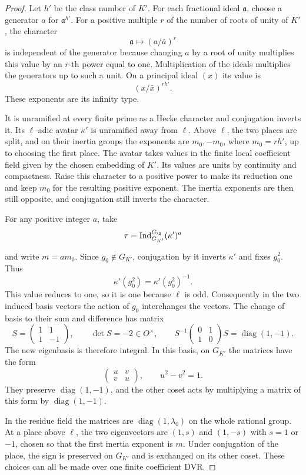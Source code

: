 \begin{proof}
Let \(h'\) be the class number of \(K'\). For each fractional
ideal \(\mathfrak a\), choose a generator \(a\) for
\(\mathfrak a^{h'}\). For a positive multiple \(r\) of
the number of roots of unity of \(K'\), the character
\[
                 \mathfrak a\longmapsto (a/\bar a)^r
\]
is independent of the generator because changing \(a\) by a
root of unity multiplies this value by an \(r\)-th power equal
to one. Multiplication of the ideals multiplies the generators
up to such a unit. On a principal ideal \((x)\) its value is
\[
                       (x/\bar x)^{rh'}.
\]
These exponents are its infinity type.

It is unramified at every finite prime as a Hecke character
and conjugation inverts it. Its \(\ell\)-adic avatar
\(\kappa'\) is unramified away from \(\ell\).
Above \(\ell\), the two places are split, and on their
inertia groups the exponents are \(m_0,-m_0\), where
\(m_0=rh'\), up to choosing the first place.
The avatar takes values in the finite local coefficient
field given by the chosen embedding of \(K'\).
Its values are units by continuity and compactness.
Raise this character to a positive power to make its
reduction one and keep \(m_0\) for the resulting
positive exponent. The inertia exponents are then
still opposite, and conjugation still inverts the
character.

For any positive integer \(a\), take
\[
 \tau=\operatorname{Ind}_{G_{K'}}^{G_{\Q}} (\kappa')^a
\]

and write \(m=am_0\). Since \(g_0\notin G_{K'}\), conjugation by it inverts
\(\kappa'\) and fixes \(g_0^2\). Thus
\[
 \kappa'(g_0^2)=\kappa'(g_0^2)^{-1}.
\]
This value reduces
to one, so it is one because \(\ell\) is odd.
Consequently in the two induced basis vectors the action
of \(g_0\) interchanges the vectors. The change of basis to their sum and difference has matrix
\[
 S=\begin{pmatrix}1&1\\1&-1\end{pmatrix},\qquad
 \det S=-2\in O^\times,\qquad
 S^{-1}\begin{pmatrix}0&1\\1&0\end{pmatrix}S=\operatorname{diag}(1,-1).
\]
The new eigenbasis is therefore integral.
In this basis, on \(G_{K'}\) the matrices have the form
\[
                    \begin{pmatrix}u&v\\v&u\end{pmatrix},
       \qquad u^2-v^2=1.
\]
They preserve \(\operatorname{diag}(1,-1)\), and the
other coset acts by multiplying a matrix of this form by
\(\operatorname{diag}(1,-1)\).

In the residue field
the matrices are \(\operatorname{diag}(1,\lambda_0)\)
on the whole rational group. At a place above \(\ell\),
the two eigenvectors are \((1,s)\) and \((1,-s)\)
with \(s=1\) or \(-1\), chosen so that the first inertia
exponent is \(m\). Under conjugation of the place,
the sign is preserved on \(G_{K'}\) and is exchanged
on its other coset. These choices can all be made
over one finite coefficient DVR.

\end{proof}

